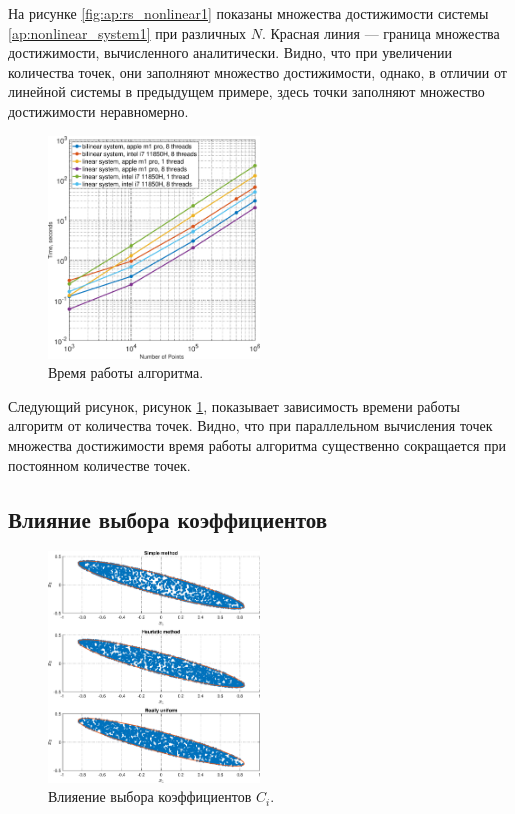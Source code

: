 \documentclass[../main.tex]{subfiles}
\begin{document}
     На рисунке \ref{fig:ap:rs_nonlinear1} показаны множества достижимости системы \eqref{ap:nonlinear_system1} при различных $N$.
       Красная линия --- граница множества достижимости, вычисленного аналитически.
   Видно, что при увеличении количества точек, они заполняют множество достижимости, однако, в отличии от линейной системы в предыдущем примере, здесь точки заполняют множество достижимости неравномерно.
   
     \begin{figure}[ht]
   	\centering
   	\includegraphics[width=0.5\textwidth]{images/time_complexity.eps}
   	\caption{Время работы алгоритма.}
   	\label{fig:ap:timings}
   \end{figure}
   
  Следующий рисунок, рисунок \ref{fig:ap:timings}, показывает зависимость времени работы алгоритм от количества точек. 
  Видно, что при параллельном вычисления точек множества достижимости время работы алгоритма существенно сокращается при постоянном количестве точек. 
  
  \subsection{Влияние выбора коэффициентов }
  
     \begin{figure}[ht]
  	\centering
  	\includegraphics[width=0.5\textwidth]{images/three_linear_system_sets.eps}
  	\caption{Влияение выбора коэффициентов $C_i$.}
  	\label{fig:ap:coeffs_RS}
  \end{figure}
  
\end{document}
